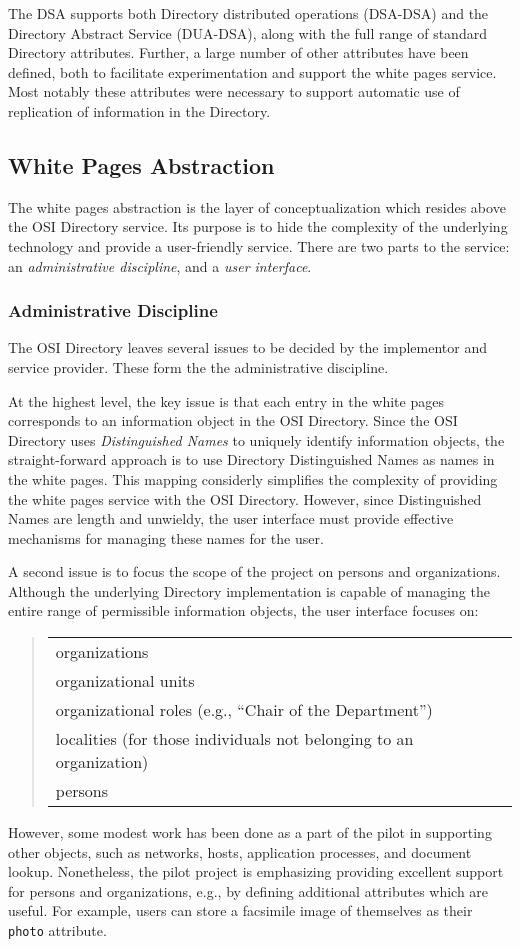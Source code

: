 The DSA supports both Directory distributed operations (DSA-DSA) and the
Directory Abstract Service (DUA-DSA),
along with the full range of standard Directory attributes.
Further,
a large number of other attributes have been defined,
both to facilitate experimentation and support the white pages service.
Most notably these attributes were necessary to support automatic use of
replication of information in the Directory.

\subsection	{White Pages Abstraction}
The white pages abstraction is the layer of conceptualization which resides
above the OSI Directory service.
Its purpose is to hide the complexity of the underlying technology and provide
a user-friendly service.
There are two parts to the service:
an {\em administrative discipline}, and a {\em user interface}.

\subsubsection	{Administrative Discipline}
The OSI Directory leaves several issues to be decided by the implementor and
service provider.
These form the the administrative discipline.

At the highest level, the key issue is that each entry in the white pages
corresponds to an information object in the OSI Directory.
Since the OSI Directory uses {\em Distinguished Names\/} to uniquely identify
information objects,
the straight-forward approach is to use Directory Distinguished Names as names
in the white pages.
This mapping considerly simplifies the complexity of providing the white pages
service with the OSI Directory.
However,
since Distinguished Names are length and unwieldy,
the user interface must provide effective mechanisms for managing these names
for the user.

A second issue is to focus the scope of the project on persons and
organizations.
Although the underlying Directory implementation is capable of managing the
entire range of permissible information objects,
the user interface focuses on:
\begin{quote}\small\begin{tabular}{l}
organizations\\ organizational units\\ organizational roles (e.g., ``Chair of
the Department'')\\ localities (for those individuals not belonging to an
organization)\\ persons
\end{tabular}\end{quote}
However,
some modest work has been done as a part of the pilot in supporting other
objects,
such as networks, hosts, application processes, and document lookup.
Nonetheless,
the pilot project is emphasizing providing excellent support for persons and
organizations,
e.g., by defining additional attributes which are useful.
For example, users can store a
facsimile image of themselves as their \verb"photo" attribute.

